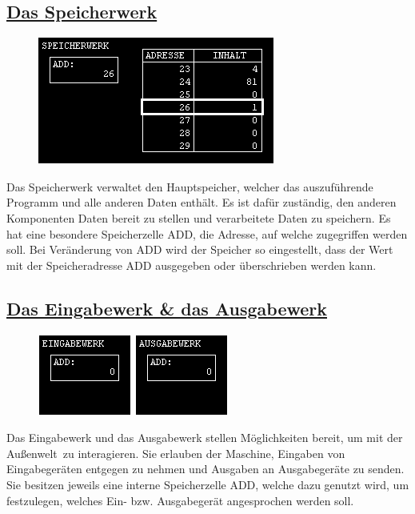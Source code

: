 \documentclass[a4paper,12pt]{article}
\begin{document}
\subsection*{\underline{Das Speicherwerk}}
\begin{figure}[h]
\centering
\includegraphics[scale=.75]{MemoryUnit.png}
\end{figure}

Das Speicherwerk verwaltet den Hauptspeicher, welcher das auszuführende Programm und alle anderen Daten enthält. Es ist dafür zuständig, den anderen Komponenten Daten bereit zu stellen und verarbeitete Daten zu speichern. Es hat eine besondere Speicherzelle ADD, die Adresse, auf welche zugegriffen werden soll. Bei Veränderung von ADD wird der Speicher so eingestellt, dass der Wert mit der Speicheradresse ADD ausgegeben oder überschrieben werden kann.


\subsection*{\underline{Das Eingabewerk \& das Ausgabewerk}}
\begin{figure}[h]
\centering
\includegraphics[scale=.75]{InputUnit.png}
\includegraphics[scale=.75]{OutputUnit.png}
\end{figure}
Das Eingabewerk und das Ausgabewerk stellen Möglichkeiten bereit, um mit der \glqq Außenwelt\grqq~zu interagieren. Sie erlauben der Maschine, Eingaben von Eingabegeräten entgegen zu nehmen und Ausgaben an Ausgabegeräte zu senden. Sie besitzen jeweils eine interne Speicherzelle ADD, welche dazu genutzt wird, um festzulegen, welches Ein- bzw. Ausgabegerät angesprochen werden soll.
\end{document}
